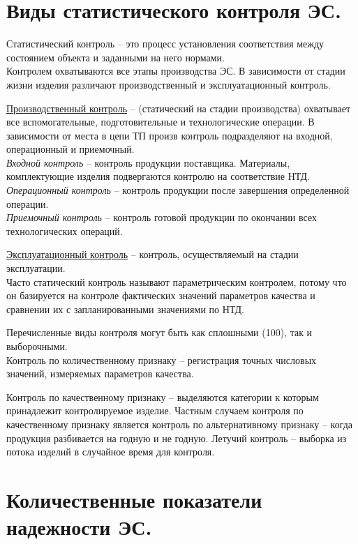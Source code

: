 \documentclass[unicode, 12pt, a4paper, oneside]{article}
\begin{document}
\section{Виды статистического контроля ЭС.}

Статистический контроль – это процесс установления соответствия между состоянием объекта и заданными на него нормами.\\
Контролем охватываются все этапы производства ЭС. В зависимости от стадии жизни изделия различают производственный и эксплуатационный контроль.

\underline{Производственный контроль} – (статический на стадии производства) охватывает все вспомогательные, подготовительные и технологические операции. В зависимости от места в цепи ТП произв контроль подразделяют на входной, операционный и приемочный.\\
\textit{Входной контроль} – контроль продукции поставщика. Материалы, комплектующие изделия подвергаются контролю на соответствие НТД.\\
\textit{Операционный контроль} – контроль продукции после завершения определенной операции.\\
\textit{Приемочный контроль} – контроль готовой продукции по окончании всех технологических операций.

\underline{Эксплуатационный контроль} – контроль, осуществляемый на стадии эксплуатации.\\
Часто статический контроль называют параметрическим контролем, потому что он базируется на контроле фактических значений параметров качества и сравнении их с запланированными значениями по НТД.

Перечисленные виды контроля могут быть как сплошными (100\textdiscount), так и выборочными.\\
Контроль по количественному признаку – регистрация точных числовых значений, измеряемых параметров качества.

Контроль по качественному признаку – выделяются категории к которым принадлежит контролируемое изделие. Частным случаем контроля по качественному признаку является контроль по альтернативному признаку – когда продукция разбивается на годную и не годную.
Летучий контроль – выборка из потока изделий в случайное время для контроля.

\section{Количественные показатели надежности ЭС.}
\end{document}
